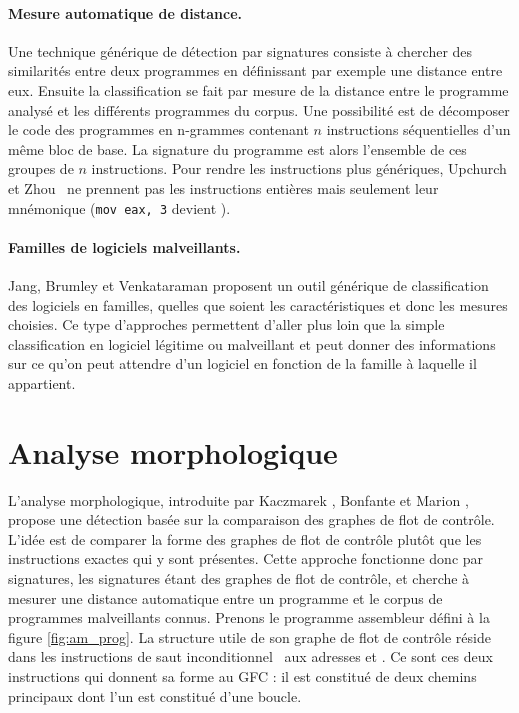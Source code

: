 \paragraph{Mesure automatique de distance.}
Une technique générique de détection par signatures consiste à chercher des similarités entre deux programmes en définissant par exemple une distance entre eux. 
Ensuite la classification se fait par mesure de la distance entre le programme analysé et les différents programmes du corpus.
Une possibilité est de décomposer le code des programmes en n-grammes contenant $n$ instructions séquentielles d'un même bloc de base. La signature du programme est alors l'ensemble de ces groupes de $n$ instructions. Pour rendre les instructions plus génériques, Upchurch et Zhou~\cite{UZ13} ne prennent pas les instructions entières mais seulement leur mnémonique (\texttt{mov eax, 3} devient \mov).

\paragraph{Familles de logiciels malveillants.}
Jang, Brumley et Venkataraman \cite{JBV11} proposent un outil générique de classification des logiciels en familles, quelles que soient les caractéristiques et donc les mesures choisies. Ce type d'approches permettent d'aller plus loin que la simple classification en logiciel légitime ou malveillant et peut donner des informations sur ce qu'on peut attendre d'un logiciel en fonction de la famille à laquelle il appartient.

\section{Analyse morphologique}
L'analyse morphologique, introduite par Kaczmarek \cite{Kacz08}, Bonfante et Marion \cite{BKM08}, propose une détection 
basée sur la comparaison des graphes de flot de contrôle. L'idée est de comparer la forme des graphes de flot de contrôle plutôt que les instructions exactes qui y sont présentes.
Cette approche fonctionne donc par signatures, les signatures étant des graphes de flot de contrôle, et cherche à mesurer une distance automatique entre un programme et le corpus de programmes malveillants connus.
Prenons le programme assembleur défini à la figure \ref{fig:am_prog}. La structure utile de son graphe de flot de contrôle réside dans les instructions de saut inconditionnel \jne\ aux adresses  et . Ce sont ces deux instructions qui donnent sa forme au GFC : il est constitué de deux chemins principaux dont l'un est constitué d'une boucle.

